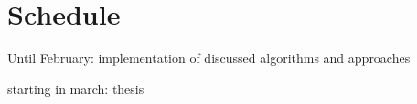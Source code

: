 
\section{Schedule}


Until February: implementation of discussed algorithms and approaches

starting in march: thesis
